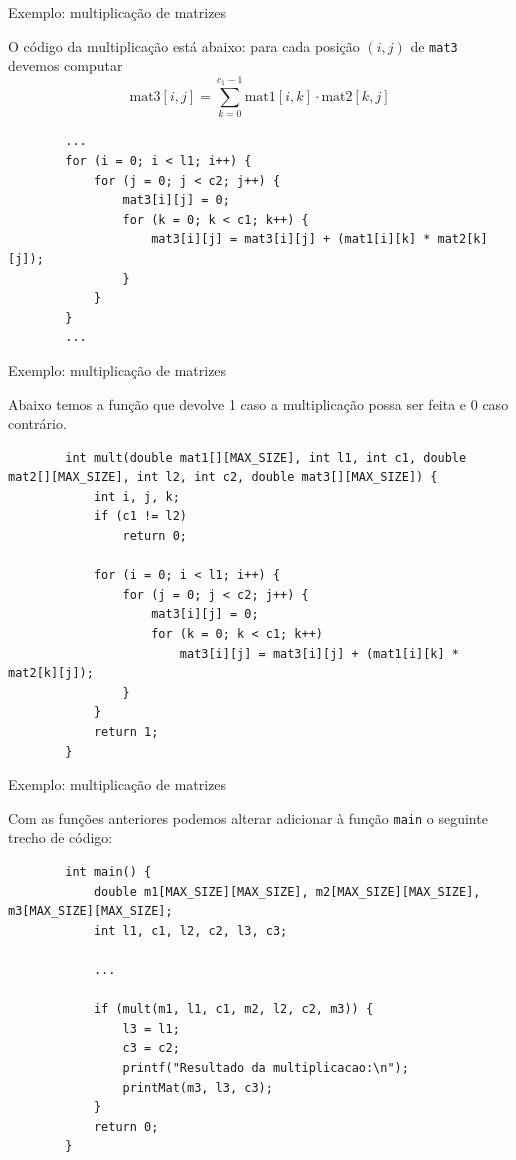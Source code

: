 \documentclass[handout]{beamer}
\newcommand{\cod}[1]{\texttt{#1}}
\begin{document}
\begin{frame}[fragile]{Exemplo: multiplicação de matrizes}

    O código da multiplicação está abaixo: para cada posição $(i,j)$ de \cod{mat3} devemos computar
    $$\text{mat3}[i,j] = \sum_{k=0}^{c_1-1} \text{mat1}[i,k] \cdot \text{mat2}[k,j]$$

    \begin{verbatim}
        ...
        for (i = 0; i < l1; i++) {
            for (j = 0; j < c2; j++) {
                mat3[i][j] = 0;
                for (k = 0; k < c1; k++) {
                    mat3[i][j] = mat3[i][j] + (mat1[i][k] * mat2[k][j]);
                }
            }
        }
        ...
        \end{verbatim}

\end{frame}

\begin{frame}[fragile]{Exemplo: multiplicação de matrizes}

    Abaixo temos a função que devolve 1 caso a multiplicação possa ser feita e 0 caso contrário.

    \begin{verbatim}
        int mult(double mat1[][MAX_SIZE], int l1, int c1, double mat2[][MAX_SIZE], int l2, int c2, double mat3[][MAX_SIZE]) {
            int i, j, k;
            if (c1 != l2)
                return 0;

            for (i = 0; i < l1; i++) {
                for (j = 0; j < c2; j++) {
                    mat3[i][j] = 0;
                    for (k = 0; k < c1; k++)
                        mat3[i][j] = mat3[i][j] + (mat1[i][k] * mat2[k][j]);
                }
            }
            return 1;
        }
    \end{verbatim}

\end{frame}

\begin{frame}[fragile]{Exemplo: multiplicação de matrizes}

    Com as funções anteriores podemos alterar adicionar à função \cod{main} o seguinte trecho de código:

    \begin{verbatim}
        int main() {
            double m1[MAX_SIZE][MAX_SIZE], m2[MAX_SIZE][MAX_SIZE], m3[MAX_SIZE][MAX_SIZE];
            int l1, c1, l2, c2, l3, c3;

            ...

            if (mult(m1, l1, c1, m2, l2, c2, m3)) {
                l3 = l1;
                c3 = c2;
                printf("Resultado da multiplicacao:\n");
                printMat(m3, l3, c3);
            }
            return 0;
        }
    \end{verbatim}

\end{frame}
\end{document}
